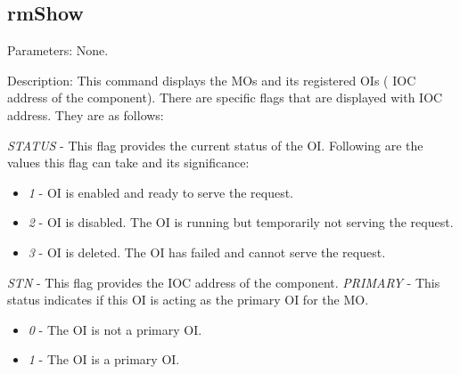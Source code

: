 \begin{flushleft}
\section{rmShow}
\begin{Desc}
\item
[Parameters:]
None.
\end{Desc}
\begin{Desc}
\item
[Description:]
This command displays the MOs and its registered OIs ( IOC address of the component). There are specific flags that are displayed with IOC address. They 
are as follows:\par
\textit{STATUS} - This flag provides the current status of the OI. Following are the values this flag can take and its significance:
\begin{itemize}
\item
\textit{1} - OI is enabled and ready to serve the request.
\item
\textit{2} - OI is disabled. The OI is running but temporarily not serving the request.
\item
\textit{3} - OI is deleted. The OI has failed and cannot serve the request.
\end{itemize}
\textit{STN} - This flag provides the IOC address of the component.
\textit{PRIMARY} - This status indicates if this OI is acting as the primary OI for the MO. 
\begin{itemize}
\item
\textit{0} - The OI is not a primary OI.
\item
\textit{1} -  The OI is a primary OI.
\end{itemize}

\end{Desc}



\end{flushleft}
